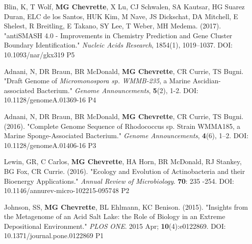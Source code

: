 \begin{cvpubs}
  \cvpub
    {Blin, K, T Wolf, \textbf{MG Chevrette}, X Lu, CJ Schwalen, SA Kautsar, HG Suarez Duran, ELC de los Santos, HUK Kim, M Nave, JS Dickschat, DA Mitchell, E Shelest, R Breitling, E Takano, SY Lee, T Weber, MH Medema. (2017). "antiSMASH 4.0 - Improvements in Chemistry Prediction and Gene Cluster Boundary Identification." \textit{Nucleic Acids Research}, 1854(1), 1019–1037. DOI: 10.1093/nar/gkx319}  %
    {P5} %

  \cvpub
    {Adnani, N, DR Braun, BR McDonald, \textbf{MG Chevrette}, CR Currie, TS Bugni. "Draft Genome of \textit{Micromonospora sp. WMMB-235}, a Marine Ascidian-associated Bacterium." \textit{Genome Announcements}, \textbf{5}(2), 1-2. DOI: 10.1128/genomeA.01369-16} %
    {P4} %

  \cvpub
  {Adnani, N, DR Braun, BR McDonald, \textbf{MG Chevrette}, CR Currie, TS Bugni. (2016). "Complete Genome Sequence of Rhodococcus sp. Strain WMMA185, a Marine Sponge-Associated Bacterium." \textit{Genome Announcements}, \textbf{4}(6), 1–2. DOI: 10.1128/genomeA.01406-16} %
    {P3} %

  \cvpub
    {Lewin, GR, C Carlos, \textbf{MG Chevrette}, HA Horn, BR McDonald, RJ Stankey, BG Fox, CR Currie. (2016). "Ecology and Evolution of Actinobacteria and their Bioenergy Applications." \textit{Annual Review of Microbiology}. \textbf{70}: 235 -254. DOI: 10.1146/annurev-micro-102215-095748} %
    {P2} %

  \cvpub
    {Johnson, SS, \textbf{MG Chevrette}, BL Ehlmann, KC Benison. (2015). "Insights from the Metagenome of an Acid Salt Lake: the Role of Biology in an Extreme Depositional Environment."  \textit{PLOS ONE}. 2015 Apr; \textbf{10}(4):e0122869. DOI: 10.1371/journal.pone.0122869} %
    {P1} %

\end{cvpubs}



